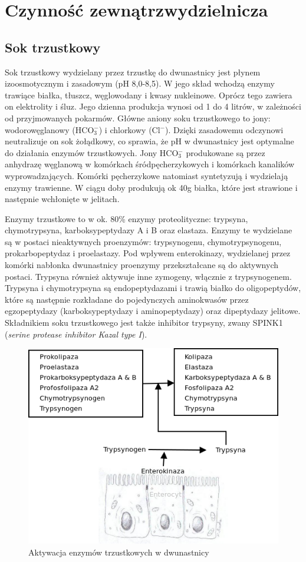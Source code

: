 \documentclass[a4paper, 12pt]{report}
\begin{document}
\section{Czynność zewnątrzwydzielnicza}
\subsection{Sok trzustkowy}
Sok trzustkowy wydzielany przez trzustkę do dwunastnicy jest płynem
izoosmotycznym i zasadowym (pH 8,0-8,5). W jego skład wchodzą enzymy
trawiące białka, tłuszcz, węglowodany i kwasy nukleinowe. Oprócz tego
zawiera on elektrolity i śluz. Jego dzienna produkcja wynosi od 1 do 4
litrów, w zależności od przyjmowanych pokarmów. Główne aniony soku
trzustkowego to jony: wodorowęglanowy (HCO$_3^-$) i chlorkowy
(Cl$^-$). Dzięki zasadowemu odczynowi neutralizuje on sok żołądkowy, 
co sprawia, że pH w dwunastnicy jest optymalne do działania enzymów
trzustkowych. Jony HCO$_3^-$ produkowane są przez anhydrazę węglanową
w komórkach śródpęcherzykowych i komórkach kanalików wyprowadzających.
Komórki pęcherzykowe natomiast syntetyzują i wydzielają enzymy
trawienne. W ciągu doby produkują ok 40g białka, które jest strawione
i następnie wchłonięte w jelitach\cite{szczeklik}.

Enzymy trzustkowe to w ok. 80\% enzymy proteolityczne: trypsyna,
chymotrypsyna, karboksypeptydazy A i B oraz elastaza. Enzymy te
wydzielane są w postaci nieaktywnych proenzymów: trypsynogenu, chymotrypsynogenu,
prokarbopeptydaz i proelastazy. Pod wpływem enterokinazy, wydzielanej
przez komórki nabłonka dwunastnicy proenzymy przekształcane są do
aktywnych postaci. Trypsyna również aktywuje inne zymogeny, włącznie z
trypsynogenem. Trypsyna i chymotrypsyna są endopeptydazami i
trawią białko do oligopeptydów, które są następnie rozkładane do
pojedynczych aminokwasów przez egzopeptydazy (karboksypeptydazy i
aminopeptydazy) oraz dipeptydazy jelitowe. Składnikiem soku
trzustkowego jest także inhibitor trypsyny, zwany SPINK1
(\textsl{serine protease inhibitor Kazal type I}).

\begin{figure}[!h]
\centering
\includegraphics[scale=0.4]{pan-enz}
\caption{Aktywacja enzymów trzustkowych w dwunastnicy}
\end{figure}
\end{document}
